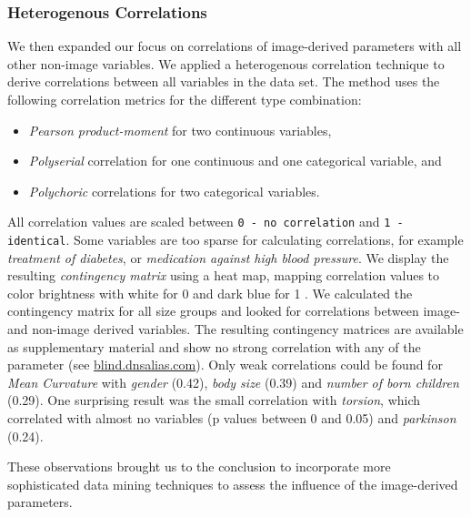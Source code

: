 \documentclass[a4paper,twoside]{style/article}
\begin{document}
\subsubsection{Heterogenous Correlations}
We then expanded our focus on correlations of image-derived parameters with all other non-image variables.
We applied a heterogenous correlation technique to derive correlations between all variables in the data set.
The method uses the following correlation metrics for the different type combination:
\begin{itemize}
\item \emph{Pearson product-moment} for two continuous variables, 
\item \emph{Polyserial} correlation for one continuous and one categorical variable, and
\item \emph{Polychoric} correlations for two categorical variables.
\end{itemize}
All correlation values are scaled between \texttt{0 - no correlation} and \texttt{1 - identical}.
Some variables are too sparse for calculating correlations, for example \emph{treatment of diabetes}, or \emph{medication against high blood pressure}.
We display the resulting \emph{contingency matrix} using a heat map, mapping correlation values to color brightness with white for 0 and dark blue for 1 \cite{Klemm2014VIS}.
We calculated the contingency matrix for all size groups and looked for correlations between image- and non-image derived variables.
The resulting contingency matrices are available as supplementary material and show no strong correlation with any of the parameter (see \url{blind.dnsalias.com}).
Only weak correlations could be found for \emph{Mean Curvature} with \emph{gender} (0.42), \emph{body size} (0.39) and \emph{number of born children} (0.29).
One surprising result was the small correlation with \emph{torsion}, which correlated with almost no variables (p values between 0 and 0.05) and \emph{parkinson} (0.24).

These observations brought us to the conclusion to incorporate more sophisticated data mining techniques to assess the influence of the image-derived parameters.
\end{document}
